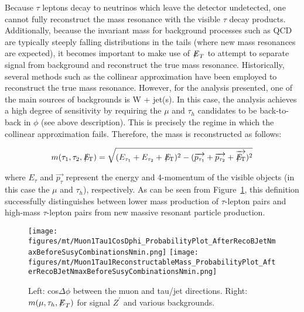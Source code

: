 Because $\tau$ leptons decay to neutrinos which leave the detector undetected, one cannot fully reconstruct the mass resonance with the visible $\tau$ decay 
products. Additionally, because the invariant mass for background processes such as QCD are typically steeply falling distributions in the tails (where new mass 
resonances are expected), it becomes important to make use of ${\not\mathrel{E}}_T$ to attempt to separate signal from background and reconstruct the true mass 
resonance. Historically, several methods such as the collinear approximation have been employed to reconstruct the true mass resonance. However, for the analysis 
presented, one of the main sources of backgrounds is W + jet(s). In this case, the analysis achieves a high degree of sensitivity by requiring the 
$\mu$ and $\tau_{h}$ candidates to be back-to-back in $\phi$ (see above description). This is precisely the regime in 
which the collinear approximation fails. Therefore, the mass is reconstructed as follows:

\begin{equation}
   m(\tau_{1},\tau_{2},{E\!\!\!\!/_{\rm T}}) = \sqrt{(E_{\tau_{1}}+E_{\tau_{2}}+{E\!\!\!\!/_{\rm
T}})^{2}-(\overrightarrow{p_{\tau_{1}}}+\overrightarrow{p_{\tau_{2}}}+\overrightarrow{{E\!\!\!\!/_{\rm T}}})^{2}}
\label{eq:ditaumass}
\end{equation}

\noindent where $E_{\tau}$ and $\overrightarrow{p_{\tau}}$ represent the energy and 4-momentum of the visible objects (in this case the $\mu$ and $\tau_{h}$), respectively.  As can be seen from Figure~\ref{fig:MuTauMass}, this definition successfully distinguishes 
between lower mass production of $\tau$-lepton pairs and high-mass $\tau$-lepton pairs from new massive resonant particle production.

\begin{figure}\centering
  \texttt{[image: figures/mt/Muon1Tau1CosDphi\_ProbabilityPlot\_AfterRecoBJetNmaxBeforeSusyCombinationsNmin.png]}
  \texttt{[image: figures/mt/Muon1Tau1ReconstructableMass\_ProbabilityPlot\_AfterRecoBJetNmaxBeforeSusyCombinationsNmin.png]}
  \caption{\label{fig:MuTauMass} Left: cos$\Delta \phi$ between the muon and tau/jet directions.  Right: $m(\mu,\tau_{h},{\not\mathrel{E}}_T)$ for signal $Z^{\prime}$ 
and various backgrounds.}
\end{figure}


